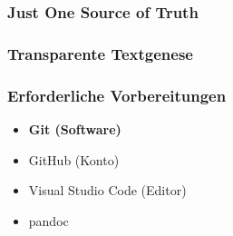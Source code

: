 \documentclass[table]{beamer}
\begin{document}
    \begin{frame}
        \frametitle{Just \textbf{One} Source of Truth}

    
    \end{frame}

    \begin{frame}
        \frametitle{Transparente Textgenese}

    
        
    
    \end{frame}

    \begin{frame}
        \frametitle{Erforderliche Vorbereitungen}

        \begin{itemize}
            \item \textbf{Git (Software)}
            \item GitHub (Konto)
            \item Visual Studio Code (Editor)
            \item pandoc
        \end{itemize}
    
    \end{frame}
\end{document}
